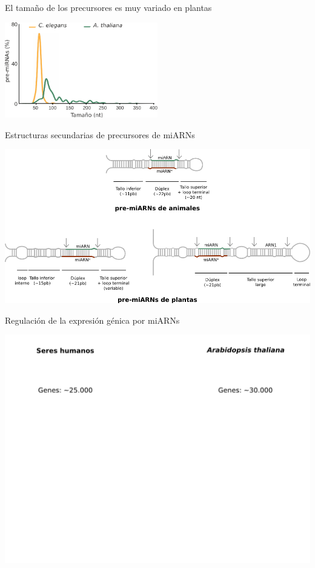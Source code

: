 \documentclass{beamer}
\begin{document}
\begin{frame}{El tamaño de los precursores es muy variado en plantas}
	\begin{center}
		\includegraphics[width=0.5\textwidth]{img/distribucion_precursores.png}
	\end{center}
\end{frame}

\begin{frame}{Estructuras secundarias de precursores de miARNs}
	\begin{center}
		\includegraphics[width=1\textwidth]{img/ss_precursores.png}
	\end{center}
\end{frame}

\begin{frame}{Regulación de la expresión génica por miARNs}
        \begin{center}
            \includegraphics[width=1\textwidth]{img/exp_gen01.png}
        \end{center}
\end{frame}
\end{document}
